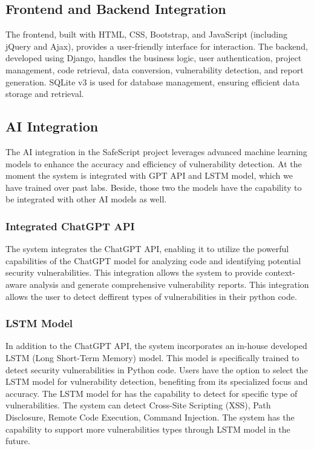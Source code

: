 \subsection{Frontend and Backend Integration}
The frontend, built with HTML, CSS, Bootstrap, and JavaScript (including jQuery and Ajax), provides a user-friendly interface for interaction. 
The backend, developed using Django, handles the business logic, user authentication, project management, code retrieval, data conversion, 
vulnerability detection, and report generation. 
SQLite v3 is used for database management, ensuring efficient data storage and retrieval.

\subsection{AI Integration}
The AI integration in the SafeScript project leverages advanced machine learning models to enhance the accuracy and efficiency of vulnerability detection. 
At the moment the system is integrated with GPT API and LSTM model, which we have trained over past labs. 
Beside, those two the models have the capability to be integrated with other AI models as well.

\subsubsection{Integrated ChatGPT API}
The system integrates the ChatGPT API, enabling it to utilize the powerful capabilities of the ChatGPT model for analyzing code and 
identifying potential security vulnerabilities. 
This integration allows the system to provide context-aware analysis and generate comprehensive vulnerability reports.
This integration allows the user to detect deffirent types of vulnerabilities in their python code.

\subsubsection{LSTM Model}
In addition to the ChatGPT API, the system incorporates an in-house developed LSTM (Long Short-Term Memory) model. 
This model is specifically trained to detect security vulnerabilities in Python code. 
Users have the option to select the LSTM model for vulnerability detection, benefiting from its specialized focus and accuracy.
The LSTM model for has the capability to detect for specific type of vulnerabilities. The system can detect Cross-Site Scripting (XSS), 
Path Disclosure, Remote Code Execution, Command Injection.
The system has the capability to support more vulnerabilities types through LSTM model in the future.

